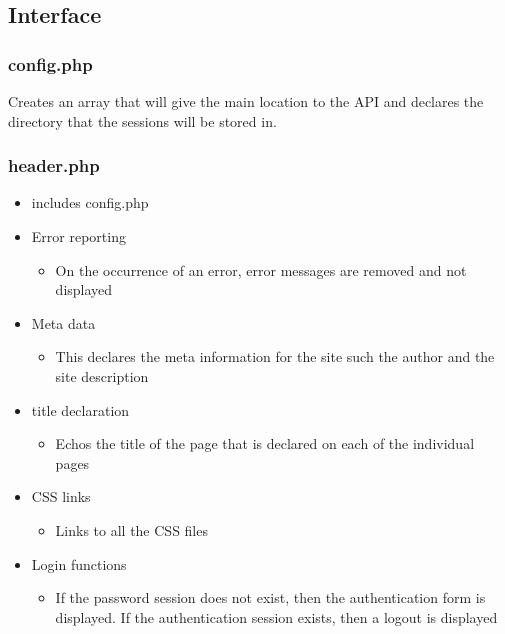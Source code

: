 \subsection{Interface}
    \subsubsection{config.php}
        Creates an array that will give the main location to the API and declares the directory that the sessions will be  stored in.

    \subsubsection{header.php}
        \begin{itemize}
            \item includes config.php
            \item Error reporting
            \begin{itemize}
                \item On the occurrence of an error, error messages are removed and not displayed
            \end{itemize}
            \item Meta data
            \begin{itemize}
                \item This declares the meta information for the site such the author and the site description
            \end{itemize}
            \item title declaration
            \begin{itemize}
                \item Echos the title of the page that is declared on each of the individual pages
            \end{itemize}
            \item CSS links
            \begin{itemize}
                \item Links to all the CSS files 
            \end{itemize}
            \item Login functions
            \begin{itemize}
                \item If the password session does not exist, then the authentication form is displayed. If the authentication session exists, then a logout is displayed 
            \end{itemize}

\end{itemize}
